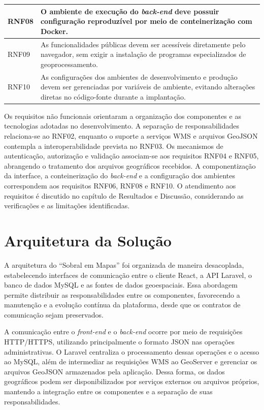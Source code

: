 \begin{table}[!htbp]
{\begin{tabular}{
            >{\raggedright\arraybackslash}p{1.5cm}
            >{\raggedright\arraybackslash}p{12.9cm}
        }
            RNF08 &
            O ambiente de execução do \textit{back-end} deve possuir configuração reproduzível por meio de conteinerização com Docker. \\
            \midrule

            RNF09 &
            As funcionalidades públicas devem ser acessíveis diretamente pelo navegador, sem exigir a instalação de programas especializados de geoprocessamento. \\
            \midrule

            RNF10 &
            As configurações dos ambientes de desenvolvimento e produção devem ser gerenciadas por variáveis de ambiente, evitando alterações diretas no código-fonte durante a implantação. \\

            \bottomrule
        \end{tabular}
    }{
    }
\end{table}

Os requisitos não funcionais orientaram a organização dos componentes e as tecnologias adotadas no desenvolvimento. A separação de responsabilidades relaciona-se ao RNF02, enquanto o suporte a serviços WMS e arquivos GeoJSON contempla a interoperabilidade prevista no RNF03. Os mecanismos de autenticação, autorização e validação associam-se aos requisitos RNF04 e RNF05, abrangendo o tratamento dos arquivos geográficos recebidos. A componentização da interface, a conteinerização do \textit{back-end} e a configuração dos ambientes correspondem aos requisitos RNF06, RNF08 e RNF10. O atendimento aos requisitos é discutido no capítulo de Resultados e Discussão, considerando as verificações e as limitações identificadas.

\FloatBarrier
\section{Arquitetura da Solução}
\label{sec:arquitetura-solucao}

A arquitetura do ``Sobral em Mapas'' foi organizada de maneira desacoplada, estabelecendo interfaces de comunicação entre o cliente React, a API Laravel, o banco de dados MySQL e as fontes de dados geoespaciais. Essa abordagem permite distribuir as responsabilidades entre os componentes, favorecendo a manutenção e a evolução contínua da plataforma, desde que os contratos de comunicação sejam preservados.

A comunicação entre o \textit{front-end} e o \textit{back-end} ocorre por meio de requisições HTTP/HTTPS, utilizando principalmente o formato JSON nas operações administrativas. O Laravel centraliza o processamento dessas operações e o acesso ao MySQL, além de intermediar as requisições WMS ao GeoServer e gerenciar os arquivos GeoJSON armazenados pela aplicação. Dessa forma, os dados geográficos podem ser disponibilizados por serviços externos ou arquivos próprios, mantendo a integração entre os componentes e a separação de suas responsabilidades.

